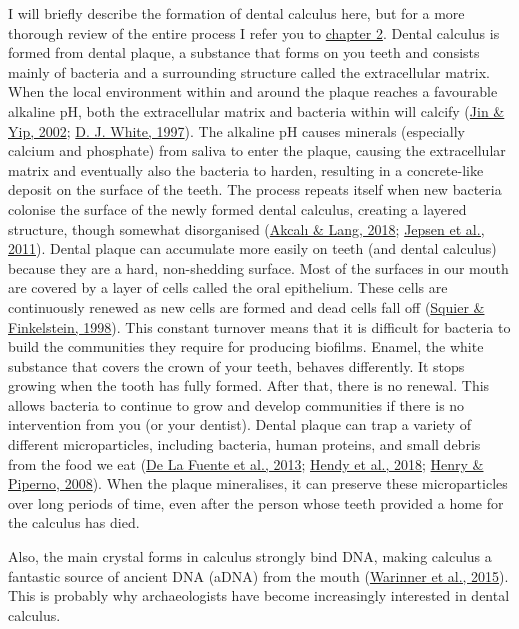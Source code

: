 \documentclass[
  letterpaper,
]{book}
\begin{document}
I will briefly describe the formation of dental calculus here, but for a
more thorough review of the entire process I refer you to
\protect\hyperlink{chap-background}{chapter 2}. Dental calculus is
formed from dental plaque, a substance that forms on you teeth and
consists mainly of bacteria and a surrounding structure called the
extracellular matrix. When the local environment within and around the
plaque reaches a favourable alkaline pH, both the extracellular matrix
and bacteria within will calcify
(\protect\hyperlink{ref-jinSupragingivalCalculus2002}{Jin \& Yip, 2002};
\protect\hyperlink{ref-whiteDentalCalculus1997}{D. J. White, 1997}). The
alkaline pH causes minerals (especially calcium and phosphate) from
saliva to enter the plaque, causing the extracellular matrix and
eventually also the bacteria to harden, resulting in a concrete-like
deposit on the surface of the teeth. The process repeats itself when new
bacteria colonise the surface of the newly formed dental calculus,
creating a layered structure, though somewhat disorganised
(\protect\hyperlink{ref-akcaliDentalCalculus2018}{Akcalı \& Lang, 2018};
\protect\hyperlink{ref-jepsenCalculusRemoval2011}{Jepsen et al., 2011}).
Dental plaque can accumulate more easily on teeth (and dental calculus)
because they are a hard, non-shedding surface. Most of the surfaces in
our mouth are covered by a layer of cells called the oral epithelium.
These cells are continuously renewed as new cells are formed and dead
cells fall off (\protect\hyperlink{ref-squierOralMucosa1998}{Squier \&
Finkelstein, 1998}). This constant turnover means that it is difficult
for bacteria to build the communities they require for producing
biofilms. Enamel, the white substance that covers the crown of your
teeth, behaves differently. It stops growing when the tooth has fully
formed. After that, there is no renewal. This allows bacteria to
continue to grow and develop communities if there is no intervention
from you (or your dentist). Dental plaque can trap a variety of
different microparticles, including bacteria, human proteins, and small
debris from the food we eat
(\protect\hyperlink{ref-delafuenteDNAHuman2013}{De La Fuente et al.,
2013}; \protect\hyperlink{ref-hendyProteomicCalculus2018}{Hendy et al.,
2018}; \protect\hyperlink{ref-henryCalculusSyria2008}{Henry \& Piperno,
2008}). When the plaque mineralises, it can preserve these
microparticles over long periods of time, even after the person whose
teeth provided a home for the calculus has died.

Also, the main crystal forms in calculus strongly bind DNA, making
calculus a fantastic source of ancient DNA (aDNA) from the mouth
(\protect\hyperlink{ref-warinnerNewEra2015}{Warinner et al., 2015}).
This is probably why archaeologists have become increasingly interested
in dental calculus.
\end{document}
